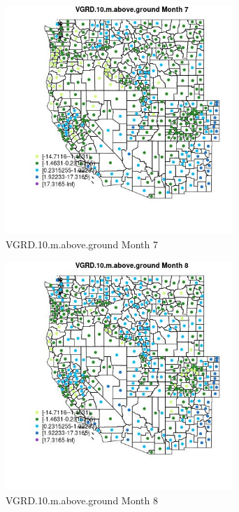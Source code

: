 \begin{figure} 
\centering  
\includegraphics[width=0.77\textwidth]{Code_Outputs/df_report_ML_predictors_CountyCentroid_Locations_Dates_2008-01-01to2018-12-31_MapObsMo7VGRD10maboveground.jpg} 
\caption{\label{fig:df_report_ML_predictors_CountyCentroid_Locations_Dates_2008-01-01to2018-12-31MapObsMo7VGRD10maboveground}VGRD.10.m.above.ground Month 7} 
\end{figure} 
 

\begin{figure} 
\centering  
\includegraphics[width=0.77\textwidth]{Code_Outputs/df_report_ML_predictors_CountyCentroid_Locations_Dates_2008-01-01to2018-12-31_MapObsMo8VGRD10maboveground.jpg} 
\caption{\label{fig:df_report_ML_predictors_CountyCentroid_Locations_Dates_2008-01-01to2018-12-31MapObsMo8VGRD10maboveground}VGRD.10.m.above.ground Month 8} 
\end{figure} 
 

